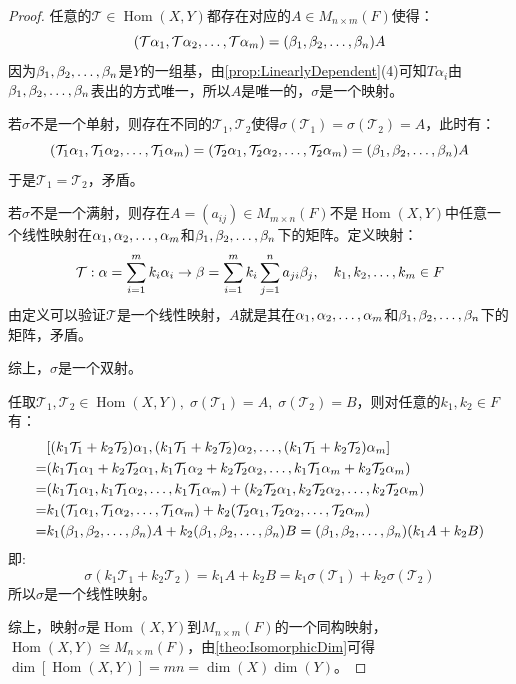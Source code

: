 \begin{proof}
	任意的$\mathcal{T}\in\operatorname{Hom}(X,Y)$都存在对应的$A\in M_{n\times m}(F)$使得：
	\begin{equation*}
		(\mathcal{T}\alpha_1, \mathcal{T}\alpha_2, \dots, \mathcal{T}\alpha_{m})=(\beta_1, \beta_2, \dots, \beta_{n})A
	\end{equation*}
	因为$\beta_1, \beta_2, \dots, \beta_{n}$是$Y$的一组基，由\cref{prop:LinearlyDependent}(4)可知$T\alpha_i$由$\beta_1, \beta_2, \dots, \beta_{n}$表出的方式唯一，所以$A$是唯一的，$\sigma$是一个映射。\par
	若$\sigma$不是一个单射，则存在不同的$\mathcal{T}_1,\mathcal{T}_2$使得$\sigma(\mathcal{T}_1)=\sigma(\mathcal{T}_2)=A$，此时有：
	\begin{equation*}
		(\mathcal{T}_1\alpha_1, \mathcal{T}_1\alpha_2, \dots, \mathcal{T}_1\alpha_{m})=(\mathcal{T}_2\alpha_1, \mathcal{T}_2\alpha_2, \dots, \mathcal{T}_2\alpha_{m})=(\beta_1, \beta_2, \dots, \beta_{n})A
	\end{equation*}
	于是$\mathcal{T}_1=\mathcal{T}_2$，矛盾。\par
	若$\sigma$不是一个满射，则存在$A=(a_{ij})\in M_{m\times n}(F)$不是$\operatorname{Hom}(X,Y)$中任意一个线性映射在$\alpha_1, \alpha_2, \dots, \alpha_{m}$和$\beta_1, \beta_2, \dots, \beta_{n}$下的矩阵。定义映射：
	\begin{equation*}
		\mathcal{T}:\alpha=\sum_{i=1}^{m}k_i\alpha_i\to\beta=\sum_{i=1}^{m}k_i\sum_{j=1}^{n}a_{ji}\beta_j,\quad k_1, k_2, \dots, k_{m}\in F
	\end{equation*}
	由定义可以验证$\mathcal{T}$是一个线性映射，$A$就是其在$\alpha_1, \alpha_2, \dots, \alpha_{m}$和$\beta_1, \beta_2, \dots, \beta_{n}$下的矩阵，矛盾。\par
	综上，$\sigma$是一个双射。\par
	任取$\mathcal{T}_1,\mathcal{T}_2\in\operatorname{Hom}(X,Y),\;\sigma(\mathcal{T}_1)=A,\;\sigma(\mathcal{T}_2)=B$，则对任意的$k_1,k_2\in F$有：
	\begin{align*}
		&[(k_1\mathcal{T}_1+k_2\mathcal{T}_2)\alpha_1, (k_1\mathcal{T}_1+k_2\mathcal{T}_2)\alpha_2, \dots, (k_1\mathcal{T}_1+k_2\mathcal{T}_2)\alpha_{m}] \\
		=&(k_1\mathcal{T}_1\alpha_1+k_2\mathcal{T}_2\alpha_1,k_1\mathcal{T}_1\alpha_2+k_2\mathcal{T}_2\alpha_2,\dots,k_1\mathcal{T}_1\alpha_m+k_2\mathcal{T}_2\alpha_m) \\
		=&(k_1\mathcal{T}_1\alpha_1,k_1\mathcal{T}_1\alpha_2,\dots,k_1\mathcal{T}_1\alpha_m)+(k_2\mathcal{T}_2\alpha_1,k_2\mathcal{T}_2\alpha_2,\dots,k_2\mathcal{T}_2\alpha_m) \\
		=&k_1(\mathcal{T}_1\alpha_1,\mathcal{T}_1\alpha_2,\dots,\mathcal{T}_1\alpha_m)+k_2(\mathcal{T}_2\alpha_1,\mathcal{T}_2\alpha_2,\dots,\mathcal{T}_2\alpha_m) \\
		=&k_1(\beta_1, \beta_2, \dots, \beta_{n})A+k_2(\beta_1, \beta_2, \dots, \beta_{n})B=(\beta_1, \beta_2, \dots, \beta_{n})(k_1A+k_2B)
	\end{align*}
	即:
	\begin{equation*}
		\sigma(k_1\mathcal{T}_1+k_2\mathcal{T}_2)=k_1A+k_2B=k_1\sigma(\mathcal{T}_1)+k_2\sigma(\mathcal{T}_2)
	\end{equation*}
	所以$\sigma$是一个线性映射。\par
	综上，映射$\sigma$是$\operatorname{Hom}(X,Y)$到$M_{n\times m}(F)$的一个同构映射，$\operatorname{Hom}(X,Y)\cong M_{n\times m}(F)$，由\cref{theo:IsomorphicDim}可得$\dim[\operatorname{Hom}(X,Y)]=mn=\dim(X)\dim(Y)$。
\end{proof}
